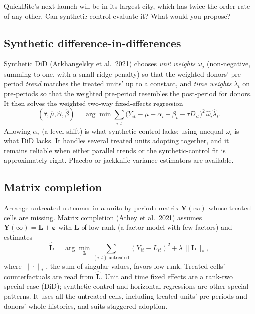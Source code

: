 \documentclass[11pt]{article}
\begin{document}
\begin{exercise}[judgment]
QuickBite's next launch will be in its largest city, which has twice the order rate of any other. Can synthetic control evaluate it? What would you
propose?
\end{exercise}

\sectionthree

\subsection*{Synthetic difference-in-differences}

Synthetic DiD (Arkhangelsky et al.\ 2021) chooses \emph{unit weights} $\omega_j$ (non-negative, summing to one, with a small ridge penalty) so that the
weighted donors' pre-period \emph{trend} matches the treated units' up to a constant, and \emph{time weights} $\lambda_t$ on pre-periods so that the weighted
pre-period resembles the post-period for donors. It then solves the weighted two-way fixed-effects regression
\[
  (\hat\tau, \hat\mu, \hat\alpha, \hat\beta) = \arg\min \sum_{i,t}\big(Y_{it} - \mu - \alpha_i - \beta_t - \tau D_{it}\big)^2\,\hat\omega_i\hat\lambda_t .
\]
Allowing $\alpha_i$ (a level shift) is what synthetic control lacks; using unequal $\omega_i$ is what DiD lacks. It handles several treated units adopting
together, and it remains reliable when either parallel trends or the synthetic-control fit is approximately right. Placebo or jackknife variance
estimators are available.

\subsection*{Matrix completion}

Arrange untreated outcomes in a units-by-periods matrix $\mathbf Y(\infty)$ whose treated cells are missing. Matrix completion (Athey et al.\ 2021) assumes
$\mathbf Y(\infty) = \mathbf L + \boldsymbol\varepsilon$ with $\mathbf L$ of low rank (a factor model with few factors) and estimates
\[
  \hat{\mathbf L} = \arg\min_{\mathbf L} \sum_{(i,t)\ \text{untreated}} (Y_{it} - L_{it})^2 + \lambda\,\|\mathbf L\|_\ast ,
\]
where $\|\cdot\|_\ast$, the sum of singular values, favors low rank. Treated cells' counterfactuals are read from $\hat{\mathbf L}$. Unit and time fixed effects are a
rank-two special case (DiD); synthetic control and horizontal regressions are other special patterns. It uses all the untreated cells, including
treated units' pre-periods and donors' whole histories, and suits staggered adoption.
\end{document}
